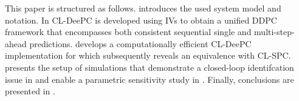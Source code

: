 This paper is structured as follows.  introduces the used system model and notation. In  \ac{CL-DeePC} is developed using \ac{IVs} to obtain a unified \ac{DDPC} framework that encompasses both consistent sequential single and multi-step-ahead predictions.  develops a computationally efficient \ac{CL-DeePC} implementation for which  subsequently reveals an equivalence with \ac{CL-SPC}.  presents the setup of simulations that demonstrate a closed-loop identifcation issue in  and enable a parametric sensitivity study in . Finally, conclusions are presented in .

%

